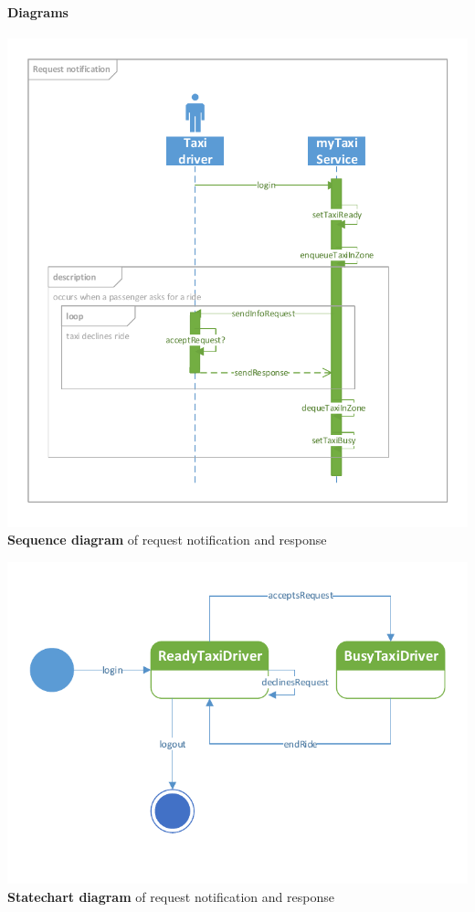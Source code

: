 	\paragraph{Diagrams}
	\begin{center}
	\includegraphics[width=\textwidth]{diagrams/notification}
	\textbf{Sequence diagram} of request notification and response
\end{center}
\begin{center}
	\includegraphics[width=\textwidth]{diagrams/request_state}
	\textbf{Statechart diagram} of request notification and response
\end{center}
	
